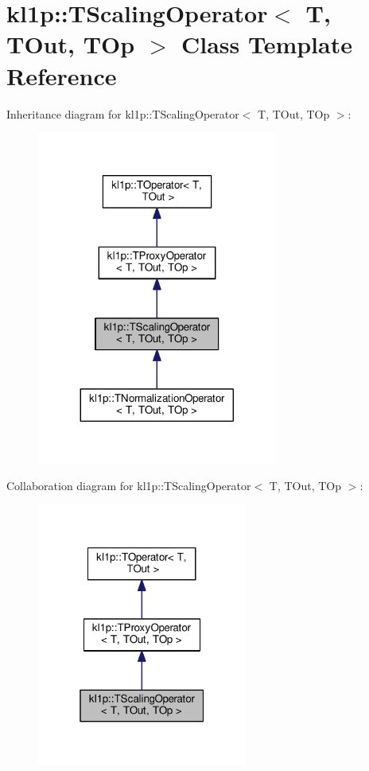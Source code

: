 \hypertarget{classkl1p_1_1TScalingOperator}{}\section{kl1p\+:\+:T\+Scaling\+Operator$<$ T, T\+Out, T\+Op $>$ Class Template Reference}
\label{classkl1p_1_1TScalingOperator}


Inheritance diagram for kl1p\+:\+:T\+Scaling\+Operator$<$ T, T\+Out, T\+Op $>$\+:
\nopagebreak
\begin{figure}[H]
\begin{center}
\leavevmode
\includegraphics[width=224pt]{classkl1p_1_1TScalingOperator__inherit__graph}
\end{center}
\end{figure}


Collaboration diagram for kl1p\+:\+:T\+Scaling\+Operator$<$ T, T\+Out, T\+Op $>$\+:
\nopagebreak
\begin{figure}[H]
\begin{center}
\leavevmode
\includegraphics[width=196pt]{classkl1p_1_1TScalingOperator__coll__graph}
\end{center}
\end{figure}
